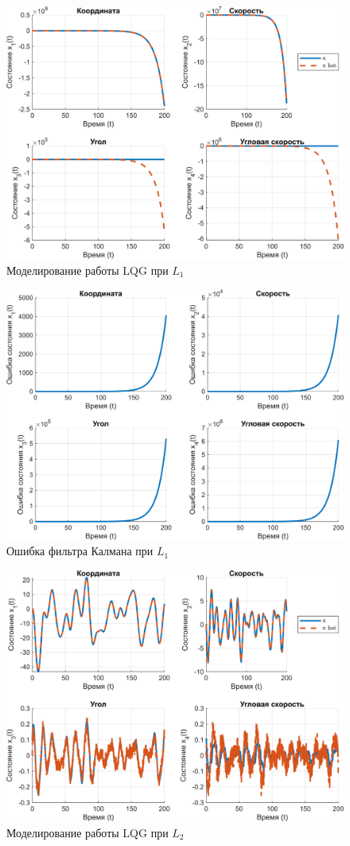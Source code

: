 \begin{figure}[H]
    \centering
    \includegraphics[width=0.7\linewidth]{figs/6.5.sim.1.png}
    \caption{Моделирование работы LQG при $L_1$}
    \label{fig:6.5.sim.1}
\end{figure}
\begin{figure}[H]
    \centering
    \includegraphics[width=0.7\linewidth]{figs/6.5.sim.1.err.png}
    \caption{Ошибка фильтра Калмана при $L_1$}
    \label{fig:6.5.sim.1.err}
\end{figure}
\begin{figure}[H]
    \centering
    \includegraphics[width=0.9\linewidth]{figs/6.5.sim.2.png}
    \caption{Моделирование работы LQG при $L_2$}
    \label{fig:6.5.sim.2}
\end{figure}
